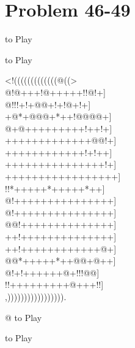 \documentclass[mcrownvopaper,10pt,onecolumn,final]{memoir}
\begin{document}
\section{Problem 46-49}
\begin{minipage}[c]{0.5\linewidth}
    \hspace{8.3mm}{\gnos%
        !
    }
    to Play
\end{minipage}
\begin{minipage}[c]{0.5\linewidth}
    \hspace{27mm}{\gnos%
        @
    }
    to Play
\end{minipage}
\begin{minipage}[c]{\linewidth}
    \centering
    {\gnos%
          <!(((((((((((((@((>\\
          @!@+++!@+++++!!@!+]\\
    @!!!+!+@@+!+!@+!+]\\
    +@*+@@@+*++!@@@@+]\\
    @+@+++++++++!++!+]\\
    +++++++++++++@@!+]\\
    ++++++++++++!+!++]\\
    +++++++++++++++!+]\\
    +++++++++++++++++]\\
    !!*+++++*+++++*++]\\
    @!+++++++++++++++]\\
    @!+++++++++++++++]\\
    @@!++++++++++++++]\\
    ++!++++++++++++++]\\
    ++!++++++++++++@+]\\
    @@*+++++*++@@+@++]\\
    @!+!++++++@+!!!@@]\\
    !!+++++++++@+++!!]\\
          ,))))))))))))))))).\\
    }
\end{minipage}
\begin{minipage}[c]{0.5\linewidth}
    \hspace{8.3mm} {\gnos%
        @  
    }
    to Play
\end{minipage}
\begin{minipage}[c]{0.5\linewidth}
    \hspace{27mm}{\gnos%
        !
    }
    to Play
\end{minipage}
\newpage
\end{document}
